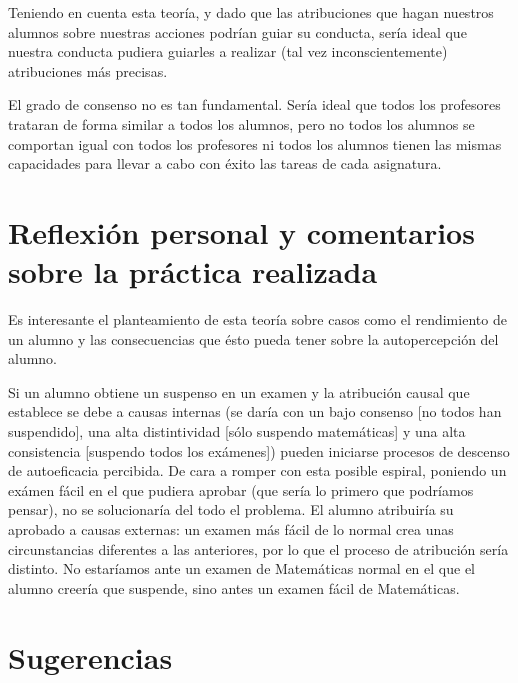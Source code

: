 \documentclass[palatino,nochap]{apuntesURJC}
\begin{document}
Teniendo en cuenta esta teoría, y dado que las atribuciones que hagan nuestros alumnos sobre nuestras acciones podrían guiar su conducta, sería ideal que nuestra conducta pudiera guiarles a realizar (tal vez inconscientemente) atribuciones más precisas.

El grado de consenso no es tan fundamental. 
%
Sería ideal que todos los profesores trataran de forma similar a todos los alumnos, pero no todos los alumnos se comportan igual con todos los profesores ni todos los alumnos tienen las mismas capacidades para llevar a cabo con éxito las tareas de cada asignatura. 

\section{Reflexión personal y comentarios sobre la práctica realizada}

Es interesante el planteamiento de esta teoría sobre casos como el rendimiento de un alumno y las consecuencias que ésto pueda tener sobre la autopercepción del alumno.

Si un alumno obtiene un suspenso en un examen y la atribución causal que establece se debe a causas internas (se daría con un bajo consenso [no todos han suspendido], una alta distintividad [sólo suspendo matemáticas] y una alta consistencia [suspendo todos los exámenes]) pueden iniciarse procesos de descenso de autoeficacia percibida.
%
De cara a romper con esta posible espiral, poniendo un exámen fácil en el que pudiera aprobar (que sería lo primero que podríamos pensar),  no se solucionaría del todo el problema.
%
El alumno atribuiría su aprobado a causas externas: un examen más fácil de lo normal crea unas circunstancias diferentes a las anteriores, por lo que el proceso de atribución sería distinto. No estaríamos ante un examen de Matemáticas normal en el que el alumno creería que suspende, sino antes un examen fácil de Matemáticas.


\section{Sugerencias}




  
\label{bibliografia}

\printindex
\end{document}
